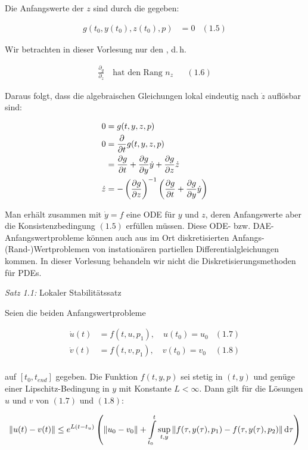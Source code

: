 Die Anfangswerte der $z$ sind durch die  gegeben:

\begin{align*}
g(t_0,y(t_0), z(t_0),p)&=0 & (1.5)
\end{align*}

Wir betrachten in dieser Vorlesung nur den , d.\,h.

\begin{align*}
\frac{\partial_g}{\partial_z} \quad \text{hat den Rang } n_z & & (1.6)
\end{align*}

Daraus folgt, dass die algebraischen Gleichungen lokal eindeutig nach $\dot z$ auflösbar sind:

\begin{align*}
0 &= g(t,y,z,p) \\
0 &= \frac\partial{\partial t} g(t,y,z,p) \\
&= \frac{\partial g}{\partial t} + \frac{\partial g}{\partial y} \dot y + \frac{\partial g}{\partial z} \dot z \\
\dot z &= -\left(\frac{\partial g}{\partial z}\right)^{-1} \left(\frac{\partial g}{\partial t} + \frac{\partial g}{\partial y} \dot y \right)
\end{align*}

Man erhält zusammen mit $\dot y = f$ eine ODE für $y$ und $z$, deren Anfangswerte aber die Konsistenzbedingung $(1.5)$ erfüllen müssen. Diese ODE- bzw. DAE-Anfangswertprobleme können auch aus im Ort diskretisierten Anfangs-(Rand-)Wertproblemen von instationären partiellen Differentialgleichungen kommen. In dieser Vorlesung behandeln wir nicht die Diskretisierungsmethoden für PDEs.

\emph{Satz 1.1:} Lokaler Stabilitätssatz

Seien die beiden Anfangswertprobleme

\begin{align*}
\dot u(t) &= f(t,u,p_1), \quad u(t_0) = u_0 & (1.7) \\
\dot v(t) &= f(t,v,p_1), \quad v(t_0) = v_0 & (1.8) \\
\end{align*}

auf $[t_0,t_{end}]$ gegeben. Die Funktion $f(t,y,p)$ sei stetig in $(t,y)$ und genüge einer Lipschitz-Bedingung in $y$ mit Konstante $L < \infty$. Dann gilt für die Lösungen $u$ und $v$ von $(1.7)$ und $(1.8)$:

\[ \|u(t)-v(t)\| \leq e^{L(t-t_{u})} \left(\|u_0-v_0\| + \int\limits_{t_0}^t \sup_{t,y} \|f( \tau, y(\tau), p_1) - f(\tau, y(\tau), p_2) \| \,\mathrm d \tau\right)\]

